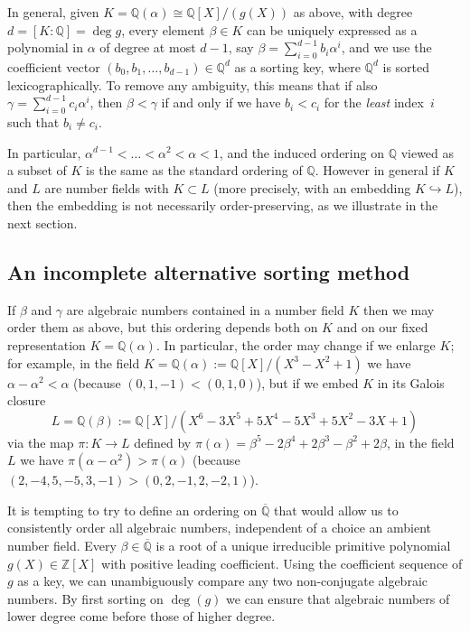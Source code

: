 \documentclass{article}
\def\Z{{\mathbb Z}}
\def\Q{{\mathbb Q}}
\def\Qbar{\overline{\Q}}
\begin{document}
In general, given $K=\Q(\alpha)\cong \Q[X]/(g(X))$ as above, with
degree $d=[K:\Q]=\deg g$, every element $\beta\in K$ can be uniquely
expressed as a polynomial in $\alpha$ of degree at most $d-1$, say
$\beta=\sum_{i=0}^{d-1}b_i\alpha^i$, and we use the coefficient vector
$(b_0,b_1,\dots,b_{d-1})\in\Q^d$ as a sorting key, where $\Q^d$ is
sorted lexicographically.  To remove any ambiguity, this means that if
also $\gamma=\sum_{i=0}^{d-1}c_i\alpha^i$, then $\beta<\gamma$ if and
only if we have $b_i<c_i$ for the \textit{least} index~$i$ such that
$b_i\not=c_i$.

In particular, $\alpha^{d-1}<\dots<\alpha^2<\alpha<1$, and the induced
ordering on $\Q$ viewed as a subset of $K$ is the same as the standard
ordering of $\Q$.  However in general if $K$ and $L$ are number fields
with $K\subset L$ (more precisely, with an embedding $K\hookrightarrow
L$), then the embedding is not necessarily order-preserving, as we
illustrate in the next section.

\subsection{An incomplete alternative sorting method}

If $\beta$ and $\gamma$ are algebraic numbers contained in a number
field $K$ then we may order them as above, but this ordering depends
both on $K$ and on our fixed representation $K=\Q(\alpha)$.  In
particular, the order may change if we enlarge $K$; for example, in
the field $K=\Q(\alpha):=\Q[X]/(X^3-X^2+1)$ we have $\alpha-\alpha^2 <
\alpha$ (because $(0,1,-1) < (0,1,0)$), but if we embed $K$ in its
Galois closure $$L=\Q(\beta):=\Q[X]/(X^6 - 3X^5 + 5X^4 - 5X^3 + 5X^2 -
3X + 1)$$ via the map $\pi:K\to L$ defined by $\pi(\alpha) = \beta^5 -
2\beta^4 + 2\beta^3 - \beta^2 + 2\beta$, in the field $L$ we have
$\pi(\alpha-\alpha^2) > \pi(\alpha)$ (because
$(2,-4,5,-5,3,-1)>(0,2,-1,2,-2,1)$).

It is tempting to try to define an ordering on $\Qbar$ that would
allow us to consistently order all algebraic numbers, independent
of a choice an ambient number field.  Every $\beta\in\Qbar$ is a root of a
unique irreducible primitive polynomial $g(X)\in\Z[X]$  with positive
leading coefficient.  Using the coefficient sequence
of $g$ as a key, we can unambiguously  compare any two non-conjugate algebraic
numbers. By first sorting on $\deg(g)$ we can ensure that algebraic numbers of
lower degree come before those of higher degree.
\end{document}
